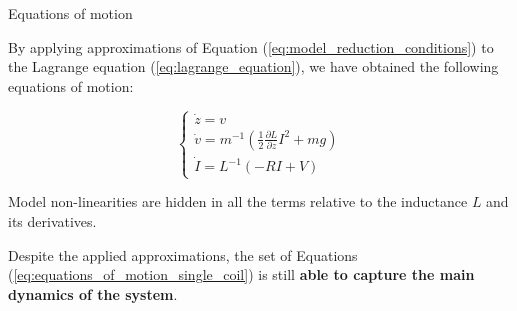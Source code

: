 \begin{frame}{Equations of motion}

    By applying approximations of Equation (\ref{eq:model_reduction_conditions}) to the Lagrange equation (\ref{eq:lagrange_equation}), we have obtained the following equations of motion:

    \begin{equation}
        \begin{cases}
            \dot{z} = v                                                                         \\
            \dot{v} = m^{-1} \left(\frac{1}{2} \frac{\partial L}{\partial z} I^2 + m g  \right) \\
            \dot{I} = L^{-1} \left(- R I + V \right)
        \end{cases}
        \label{eq:equations_of_motion_single_coil}
    \end{equation}

    Model non-linearities are hidden in all the terms relative to the inductance $L$ and its derivatives.

    \vspace{9pt}

    Despite the applied approximations, the set of Equations (\ref{eq:equations_of_motion_single_coil}) is still \textbf{able to capture the main dynamics of the system}.

\end{frame}
